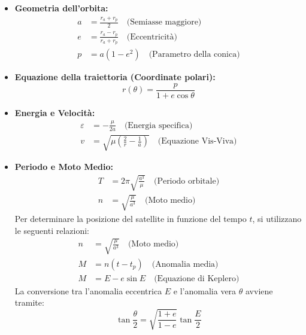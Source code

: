 \documentclass[12pt, a4paper]{article}
\begin{document}
\begin{itemize}
    \item \textbf{Geometria dell'orbita:}
    \begin{align*}
        a &= \frac{r_a + r_p}{2} \quad \text{(Semiasse maggiore)} \\
        e &= \frac{r_a - r_p}{r_a + r_p} \quad \text{(Eccentricità)} \\
        p &= a(1 - e^2) \quad \text{(Parametro della conica)}
    \end{align*}

    \item \textbf{Equazione della traiettoria (Coordinate polari):}
    \begin{equation*}
        r(\theta) = \frac{p}{1 + e \cos \theta}
    \end{equation*}

    \item \textbf{Energia e Velocità:}
    \begin{align*}
        \varepsilon &= -\frac{\mu}{2a} \quad \text{(Energia specifica)} \\
        v &= \sqrt{\mu \left( \frac{2}{r} - \frac{1}{a} \right)} \quad \text{(Equazione Vis-Viva)}
    \end{align*}

    \item \textbf{Periodo e Moto Medio:}
    \begin{align*}
        T &= 2\pi \sqrt{\frac{a^3}{\mu}} \quad \text{(Periodo orbitale)} \\
        n &= \sqrt{\frac{\mu}{a^3}} \quad \text{(Moto medio)}
    \end{align*}
    Per determinare la posizione del satellite in funzione del tempo $t$, si utilizzano le seguenti relazioni:
\begin{align*}
    n &= \sqrt{\frac{\mu}{a^3}} \quad \text{(Moto medio)} \\
    M &= n(t - t_p) \quad \text{(Anomalia media)} \\
    M &= E - e \sin E \quad \text{(Equazione di Keplero)}
\end{align*}
La conversione tra l'anomalia eccentrica $E$ e l'anomalia vera $\theta$ avviene tramite:
\begin{equation*}
    \tan \frac{\theta}{2} = \sqrt{\frac{1+e}{1-e}} \tan \frac{E}{2}
\end{equation*}


\end{itemize}
\end{document}
